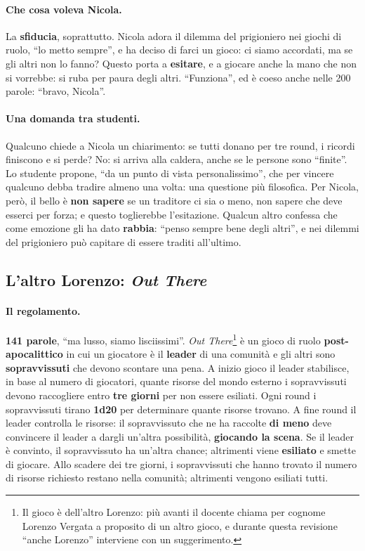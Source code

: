 \paragraph{Che cosa voleva Nicola.} La \textbf{sfiducia}, soprattutto. Nicola adora il
dilemma del prigioniero nei giochi di ruolo, ``lo metto sempre'', e ha deciso di farci
un gioco: ci siamo accordati, ma se gli altri non lo fanno? Questo porta a
\textbf{esitare}, e a giocare anche la mano che non si vorrebbe: si ruba per paura
degli altri. ``Funziona'', ed è coeso anche nelle 200 parole: ``bravo, Nicola''.

\paragraph{Una domanda tra studenti.} Qualcuno chiede a Nicola un chiarimento: se
tutti donano per tre round, i ricordi finiscono e si perde? No: si arriva alla
caldera, anche se le persone sono ``finite''. Lo studente propone, ``da un punto di
vista personalissimo'', che per vincere qualcuno debba tradire almeno una volta: una
questione più filosofica. Per Nicola, però, il bello è \textbf{non sapere} se un
traditore ci sia o meno, non sapere che deve esserci per forza; e questo toglierebbe
l'esitazione. Qualcun altro confessa che come emozione gli ha dato \textbf{rabbia}:
``penso sempre bene degli altri'', e nei dilemmi del prigioniero può capitare di
essere traditi all'ultimo.

\subsection{L'altro Lorenzo: \emph{Out There}}
\label{a6:sec:outthere}

\paragraph{Il regolamento.} \textbf{141 parole}, ``ma lusso, siamo lisciissimi''.
\emph{Out There}\footnote{Il gioco è dell'altro Lorenzo: più avanti il docente
chiama per cognome Lorenzo Vergata a proposito di un altro gioco, e durante questa
revisione ``anche Lorenzo'' interviene con un suggerimento.} è un gioco di ruolo
\textbf{post-apocalittico} in cui un giocatore è il \textbf{leader} di una comunità e
gli altri sono \textbf{sopravvissuti} che devono scontare una pena. A inizio gioco il
leader stabilisce, in base al numero di giocatori, quante risorse del mondo esterno i
sopravvissuti devono raccogliere entro \textbf{tre giorni} per non essere esiliati.
Ogni round i sopravvissuti tirano \textbf{1d20} per determinare quante risorse
trovano. A fine round il leader controlla le risorse: il sopravvissuto che ne ha
raccolte \textbf{di meno} deve convincere il leader a dargli un'altra possibilità,
\textbf{giocando la scena}. Se il leader è convinto, il sopravvissuto ha un'altra
chance; altrimenti viene \textbf{esiliato} e smette di giocare. Allo scadere dei tre
giorni, i sopravvissuti che hanno trovato il numero di risorse richiesto restano
nella comunità; altrimenti vengono esiliati tutti.

